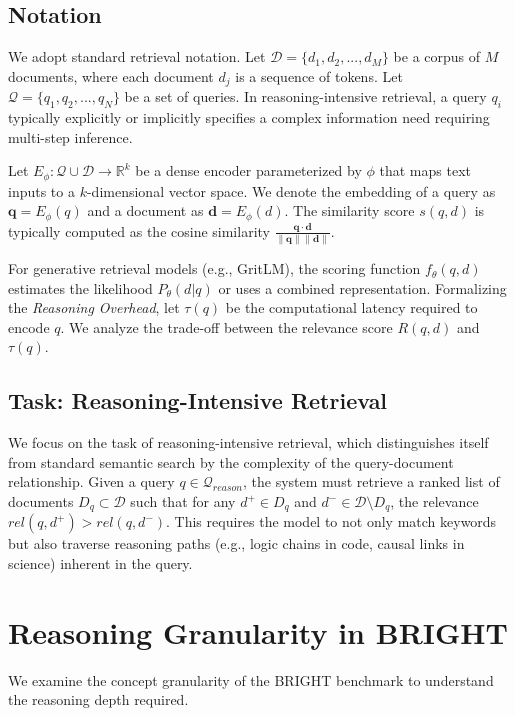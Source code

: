 \documentclass[sigconf]{acmart}
\begin{document}
\subsection{Notation}
We adopt standard retrieval notation. Let $\mathcal{D} = \{d_1, d_2, ..., d_M\}$ be a corpus of $M$ documents, where each document $d_j$ is a sequence of tokens. Let $\mathcal{Q} = \{q_1, q_2, ..., q_N\}$ be a set of queries. In reasoning-intensive retrieval, a query $q_i$ typically explicitly or implicitly specifies a complex information need requiring multi-step inference.

Let $E_\phi: \mathcal{Q} \cup \mathcal{D} \rightarrow \mathbb{R}^k$ be a dense encoder parameterized by $\phi$ that maps text inputs to a $k$-dimensional vector space. We denote the embedding of a query as $\mathbf{q} = E_\phi(q)$ and a document as $\mathbf{d} = E_\phi(d)$. The similarity score $s(q, d)$ is typically computed as the cosine similarity $\frac{\mathbf{q} \cdot \mathbf{d}}{\|\mathbf{q}\| \|\mathbf{d}\|}$.

For generative retrieval models (e.g., GritLM), the scoring function $f_\theta(q, d)$ estimates the likelihood $P_\theta(d|q)$ or uses a combined representation. Formalizing the \textit{Reasoning Overhead}, let $\tau(q)$ be the computational latency required to encode $q$. We analyze the trade-off between the relevance score $R(q, d)$ and $\tau(q)$.

\subsection{Task: Reasoning-Intensive Retrieval}
We focus on the task of reasoning-intensive retrieval, which distinguishes itself from standard semantic search by the complexity of the query-document relationship. Given a query $q \in \mathcal{Q}_{reason}$, the system must retrieve a ranked list of documents $D_q \subset \mathcal{D}$ such that for any $d^+ \in D_q$ and $d^- \in \mathcal{D} \setminus D_q$, the relevance $rel(q, d^+) > rel(q, d^-)$. This requires the model to not only match keywords but also traverse reasoning paths (e.g., logic chains in code, causal links in science) inherent in the query.

\section{Reasoning Granularity in BRIGHT}
We examine the concept granularity of the BRIGHT benchmark to understand the reasoning depth required.
\end{document}
